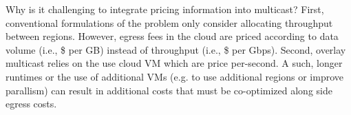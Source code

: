 Why is it challenging to integrate pricing information into multicast?
% 
First, conventional formulations of the problem only consider allocating throughput between regions.
% 
However, egress fees in the cloud are priced according to data volume (i.e., \$ per GB) instead of throughput (i.e., \$ per Gbps).
%
Second, overlay multicast relies on the use cloud VM which are price per-second. A such, longer runtimes or the use of additional VMs (e.g. to use additional regions or improve parallism) can result in additional costs that must be co-optimized along side egress costs. 
% 







